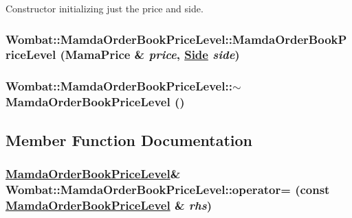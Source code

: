 Constructor initializing just the price and side. 

\hypertarget{classWombat_1_1MamdaOrderBookPriceLevel_e0cf6f3c3083f53f92171bee7b9ce134}{
\subsubsection[MamdaOrderBookPriceLevel]{\setlength{\rightskip}{0pt plus 5cm}Wombat::Mamda\-Order\-Book\-Price\-Level::Mamda\-Order\-Book\-Price\-Level (Mama\-Price \& {\em price}, \hyperlink{classWombat_1_1MamdaOrderBookPriceLevel_384c34b0a74d874b8969dee9b0d3718d}{Side} {\em side})}}
\label{classWombat_1_1MamdaOrderBookPriceLevel_e0cf6f3c3083f53f92171bee7b9ce134}


\hypertarget{classWombat_1_1MamdaOrderBookPriceLevel_b2ff6deeca05206499b70c532b2e2193}{
\subsubsection[$\sim$MamdaOrderBookPriceLevel]{\setlength{\rightskip}{0pt plus 5cm}Wombat::Mamda\-Order\-Book\-Price\-Level::$\sim$Mamda\-Order\-Book\-Price\-Level ()}}
\label{classWombat_1_1MamdaOrderBookPriceLevel_b2ff6deeca05206499b70c532b2e2193}




\subsection{Member Function Documentation}
\hypertarget{classWombat_1_1MamdaOrderBookPriceLevel_66dce36048fc4ad101fdc8fa06875bb1}{
\subsubsection[operator=]{\setlength{\rightskip}{0pt plus 5cm}\hyperlink{classWombat_1_1MamdaOrderBookPriceLevel}{Mamda\-Order\-Book\-Price\-Level}\& Wombat::Mamda\-Order\-Book\-Price\-Level::operator= (const \hyperlink{classWombat_1_1MamdaOrderBookPriceLevel}{Mamda\-Order\-Book\-Price\-Level} \& {\em rhs})}}
\label{classWombat_1_1MamdaOrderBookPriceLevel_66dce36048fc4ad101fdc8fa06875bb1}


